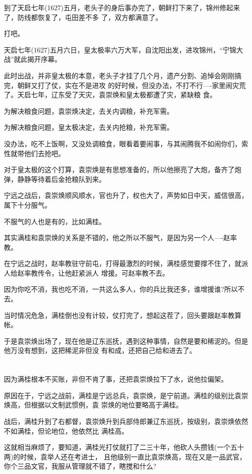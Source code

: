 \documentclass[11pt,a4paper,onecolumn]{article}
\begin{document}
到了天启七年(1627)五月，老头子的身后事办完了，朝鲜打下来了，锦州修起来了，防线都恢复了，屯田差不多
了，双方都满意了。

打吧。

天启七年(1627)五月六日，皇太极率六万大军，自沈阳出发，进攻锦州，``宁锦大战''就此揭开序幕。

此时出战，并非皇太极的本意，老头子才挂了几个月，遗产分割、追悼会刚刚搞完，朝鲜又打了仗，实在不是进攻
的好时候，但没办法，不打不行----家里闹灾荒了。天启七年，辽东受了天灾，袁崇焕和皇太极都遭了灾，紧缺粮
食。

为解决粮食问题，袁崇焕决定，去关内调粮，补充军需。

为解决粮食问题，皇太极决定，去关内抢粮，补充军需。

没办法，吃不上饭啊，又没处调粮食，眼看着要闹事，与其闹腾我不如闹你们，索性就带他们去抢吧。

对于皇太极的这个打算，袁崇焕是有思想准备的，所以他擦亮了大炮，备齐了炮弹，静静等待着后金抢粮队到来。

宁远之战后，袁崇焕顺风顺水，官也升了，权也大了，声势如日中天，威信很高，属下十分服气。

不服气的人也是有的，比如满桂。

其实满桂和袁崇焕的关系是不错的，他之所以不服气，是因为另一个人----赵率教。

在宁远之战时，赵率教驻守前屯，打得最激烈的时候，满桂感觉要撑不住了，就派人给赵率教传令，让他赶紧派人
增援。可赵率教不去。

因为你吃不消，我也吃不消，一共这么多人，你的兵比我还多，谁增援谁?所以不去。

当时情况危急，满桂倒也没有计较，仗打完了，想起这茬了，回头要跟赵率教算帐。

于是袁崇焕出场了，现在他是辽东巡抚，遇到这种事情，自然是要和稀泥的。但是他万没有想到，这把稀泥非但没
有和成，还把自己给和进去了。

\section[\thesection]{}

因为满桂根本不买账，非但不肯了事，还把袁崇焕拉下了水，说他拉偏架。

原因在于，宁远之战前，满桂是宁远总兵，袁崇焕，是宁前道。满桂的级别比袁崇焕高，但根据以文制武惯例，袁
崇焕的地位要略高于满桂。

战后，满桂升到了右都督，袁崇焕升到兵部侍郎兼辽东巡抚，按级别，袁崇焕依然不如满桂，但论地位，他依然比
满桂高。

这就相当麻烦了，要知道，满桂光打仗就打了二三十年，他砍人头攒钱(一个五十两)的时候，袁举人还在考进士，
且他级别一直比袁崇焕高，现在又是一品武官，你个三品文官，我服从管理就不错了，瞎搅和什么?
\end{document}
